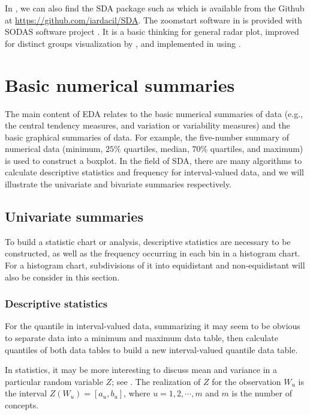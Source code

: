 \documentclass[article]{jss}
\begin{document}
In , we can also find the SDA package such as  \cite{umbleja:2020} which is available from the Github at \url{https://github.com/iardacil/SDA}. The zoomstart software in  is provided with SODAS software project \cite{diday:2008}. It is a basic thinking for general radar plot, improved for distinct groups visualization by , and implemented in  using .




\section{Basic numerical summaries}

The main content of EDA relates to the basic numerical summaries of data (e.g., the central tendency measures, and variation or variability measures) and the basic graphical summaries of data. For example, the five-number summary of numerical data (minimum, $25\%$ quartiles, median, $70\%$ quartiles, and maximum) is used to construct a boxplot. In the field of SDA, there are many algorithms to calculate descriptive statistics and frequency for interval-valued data, and we will illustrate the univariate and bivariate summaries respectively.

\subsection{Univariate summaries}

To build a statistic chart or analysis, descriptive statistics are necessary to be constructed, as well as the frequency occurring in each bin in a histogram chart. For a histogram chart, subdivisions of it into equidistant and non-equidistant will also be consider in this section.

\subsubsection{Descriptive statistics}

For the quantile in interval-valued data, summarizing it may seem to be obvious to separate data into a minimum and maximum data table, then calculate quantiles of both data tables to build a new interval-valued quantile data table.

In statistics, it may be more interesting to discuss mean and variance in a particular random variable $Z$; see \cite{bertrand:2000}. The realization of $Z$ for the observation $W_u$ is the interval $Z(W_u) = [a_u,b_u]$, where $u=1,2,\cdots,m$ and $m$ is the number of concepts.
\end{document}
